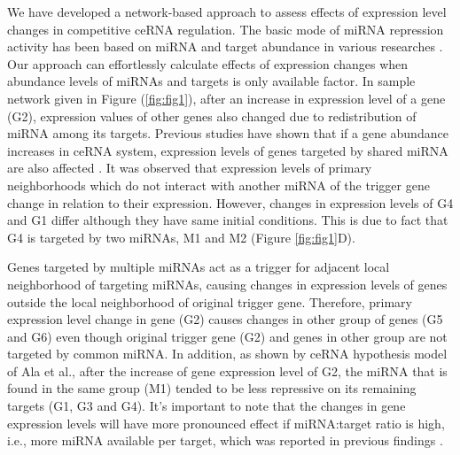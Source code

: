 \documentclass[a4,center,fleqn]{NAR}
\begin{document}
We have developed a network-based approach to assess effects of
expression level changes in competitive ceRNA regulation. The basic mode
of miRNA repression activity has been based on miRNA and target
abundance in various researches
\citep{arvey_target_2010, denzler_assessing_2014}. Our approach can
effortlessly calculate effects of expression changes when abundance
levels of miRNAs and targets is only available factor. In sample network
given in Figure (\ref{fig:fig1}), after an increase in expression level
of a gene (G2), expression values of other genes also changed due to
redistribution of miRNA among its targets. Previous studies have shown
that if a gene abundance increases in ceRNA system, expression levels of
genes targeted by shared miRNA are also affected
\citep{lai_understanding_2016, salmena_cerna_2011, tay_multilayered_2014}.
It was observed that expression levels of primary neighborhoods which do
not interact with another miRNA of the trigger gene change in relation
to their expression. However, changes in expression levels of G4 and G1
differ although they have same initial conditions. This is due to fact
that G4 is targeted by two miRNAs, M1 and M2 (Figure \ref{fig:fig1}D).

Genes targeted by multiple miRNAs act as a trigger for adjacent local
neighborhood of targeting miRNAs, causing changes in expression levels
of genes outside the local neighborhood of original trigger gene.
Therefore, primary expression level change in gene (G2) causes changes
in other group of genes (G5 and G6) even though original trigger gene
(G2) and genes in other group are not targeted by common miRNA. In
addition, as shown by ceRNA hypothesis model of Ala et al., after the
increase of gene expression level of G2, the miRNA that is found in the
same group (M1) tended to be less repressive on its remaining targets
(G1, G3 and G4). It's important to note that the changes in gene
expression levels will have more pronounced effect if miRNA:target ratio
is high, i.e., more miRNA available per target, which was reported in
previous findings
\citep{arvey_target_2010, bosson_endogenous_2014, denzler_assessing_2014}.
\end{document}
